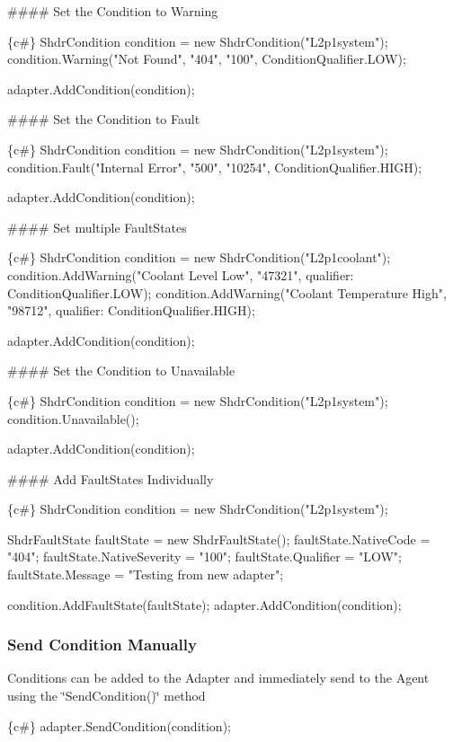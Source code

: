 \#\#\#\# Set the Condition to Warning 
\begin{DoxyCode}
\{c#\}
ShdrCondition condition = new ShdrCondition("L2p1system");
condition.Warning("Not Found", "404", "100", ConditionQualifier.LOW);

adapter.AddCondition(condition);
\end{DoxyCode}


\#\#\#\# Set the Condition to Fault 
\begin{DoxyCode}
\{c#\}
ShdrCondition condition = new ShdrCondition("L2p1system");
condition.Fault("Internal Error", "500", "10254", ConditionQualifier.HIGH);

adapter.AddCondition(condition);
\end{DoxyCode}


\#\#\#\# Set multiple Fault\+States 
\begin{DoxyCode}
\{c#\}
ShdrCondition condition = new ShdrCondition("L2p1coolant");
condition.AddWarning("Coolant Level Low", "47321", qualifier: ConditionQualifier.LOW);
condition.AddWarning("Coolant Temperature High", "98712", qualifier: ConditionQualifier.HIGH);

adapter.AddCondition(condition);
\end{DoxyCode}


\#\#\#\# Set the Condition to Unavailable 
\begin{DoxyCode}
\{c#\}
ShdrCondition condition = new ShdrCondition("L2p1system");
condition.Unavailable();

adapter.AddCondition(condition);
\end{DoxyCode}


\#\#\#\# Add Fault\+States Individually 
\begin{DoxyCode}
\{c#\}
ShdrCondition condition = new ShdrCondition("L2p1system");

ShdrFaultState faultState = new ShdrFaultState();
faultState.NativeCode = "404";
faultState.NativeSeverity = "100";
faultState.Qualifier = "LOW";
faultState.Message = "Testing from new adapter";

condition.AddFaultState(faultState);
adapter.AddCondition(condition);
\end{DoxyCode}


\subsubsection*{Send Condition Manually}

Conditions can be added to the Adapter and immediately send to the Agent using the \char`\"{}\+Send\+Condition()\char`\"{} method 
\begin{DoxyCode}
\{c#\}
adapter.SendCondition(condition);
\end{DoxyCode}


